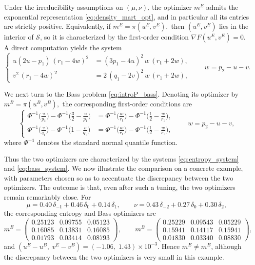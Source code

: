 \documentclass[reqno, a4paper]{amsart}
\theoremstyle{plain}
\theoremstyle{definition}
\theoremstyle{remark}
\numberwithin{equation}{section}
\numberwithin{theorem}{section}
\begin{document}
	Under the irreducibility assumptions on $(\mu,\nu)$, 
	the optimizer $m^E$ admits the exponential representation
	\eqref{eq:density_mart_opt}, and in particular all its entries are strictly positive. Equivalently, if
	$
	m^E=\pi(u^E,v^E),
	$
	then $(u^E,v^E)$ lies in the interior of $\mathcal S$, so it is characterized by the first-order condition
	$
	\nabla F(u^E,v^E)=0.
	$
	A direct computation yields the system
	\begin{equation}\label{eq:entropy_system}
		\left\{
		\begin{aligned}
			u(2u-p_1)\,(r_1-4w)^2
			&=
			(3p_1-4u)^2\,w\,(r_1+2w),\\[4pt]
			v^2\,(r_1-4w)^2
			&=
			2\,(q_1-2v)^2\,w\,(r_1+2w),
		\end{aligned}
		\right.
		\qquad w=p_2-u-v.
	\end{equation}
	
	We next turn to the Bass problem \eqref{eq:introP_bass}. Denoting its optimizer by
	$
	m^B=\pi(u^B,v^B),
	$
	the corresponding first-order conditions are
	\begin{equation}\label{eq:bass_system}
		\left\{
		\begin{aligned}
			\Phi^{-1}\!\Big(\frac{u}{p_1}\Big)-\Phi^{-1}\!\Big(\frac32-\frac{u}{p_1}\Big)
			&=
			\Phi^{-1}\!\Big(\frac{w}{r_1}\Big)-\Phi^{-1}\!\Big(\frac12-\frac{w}{r_1}\Big),\\[6pt]
			\Phi^{-1}\!\Big(\frac{v}{q_1}\Big)-\Phi^{-1}\!\Big(1-\frac{v}{q_1}\Big)
			&=
			\Phi^{-1}\!\Big(\frac{w}{r_1}\Big)-\Phi^{-1}\!\Big(\frac12-\frac{w}{r_1}\Big),
		\end{aligned}
		\right.
		\qquad w=p_2-u-v,
	\end{equation}
	where $\Phi^{-1}$ denotes the standard normal quantile function.
	
	Thus the two optimizers are characterized by the systems \eqref{eq:entropy_system} and \eqref{eq:bass_system}. We now illustrate the comparison on a concrete example, with parameters chosen so as to accentuate the discrepancy between the two optimizers. The outcome is that, even after such a tuning, the two optimizers remain remarkably close. 	For
	\[
	\mu=0.40\,\delta_{-1}+0.46\,\delta_0+0.14\,\delta_1,
	\qquad
	\nu=0.43\,\delta_{-2}+0.27\,\delta_0+0.30\,\delta_2,
	\]
	the corresponding entropy and Bass optimizers are
	\[
	m^E=
	\begin{pmatrix}
		0.25123 & 0.09755 & 0.05123\\
		0.16085 & 0.13831 & 0.16085\\
		0.01793 & 0.03414 & 0.08793
	\end{pmatrix},
	\qquad
	m^B=
	\begin{pmatrix}
		0.25229 & 0.09543 & 0.05229\\
		0.15941 & 0.14117 & 0.15941\\
		0.01830 & 0.03340 & 0.08830
	\end{pmatrix},
	\]
	and
	$
	(u^E-u^B,\;v^E-v^B)
	=
	(-1.06,\;1.43)\times 10^{-3}.
	$
	Hence $m^E\neq m^B$, although the discrepancy between the two optimizers is very small in this example.
	
	
	
	
	
	
	
	
	
	
	
	
\end{document}
